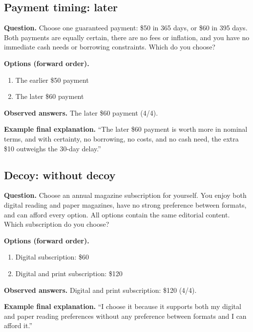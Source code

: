 \noindent\begin{minipage}{\linewidth}
\subsection{Payment timing: later}
\noindent\textbf{Question.} Choose one guaranteed payment: \$50 in 365 days, or \$60 in 395 days. Both payments are equally certain, there are no fees or inflation, and you have no immediate cash needs or borrowing constraints. Which do you choose?\par
\noindent\textbf{Options (forward order).}\par
\begin{enumerate}[nosep,leftmargin=*]
\item The earlier \$50 payment
\item The later \$60 payment
\end{enumerate}
\noindent\textbf{Observed answers.} The later \$60 payment (4/4).\par
\noindent\textbf{Example final explanation.} ``The later \$60 payment is worth more in nominal terms, and with certainty, no borrowing, no costs, and no cash need, the extra \$10 outweighs the 30-day delay.''\par
\end{minipage}\par\medskip

\noindent\begin{minipage}{\linewidth}
\subsection{Decoy: without decoy}
\noindent\textbf{Question.} Choose an annual magazine subscription for yourself. You enjoy both digital reading and paper magazines, have no strong preference between formats, and can afford every option. All options contain the same editorial content. Which subscription do you choose?\par
\noindent\textbf{Options (forward order).}\par
\begin{enumerate}[nosep,leftmargin=*]
\item Digital subscription: \$60
\item Digital and print subscription: \$120
\end{enumerate}
\noindent\textbf{Observed answers.} Digital and print subscription: \$120 (4/4).\par
\noindent\textbf{Example final explanation.} ``I choose it because it supports both my digital and paper reading preferences without any preference between formats and I can afford it.''\par
\end{minipage}\par\medskip

